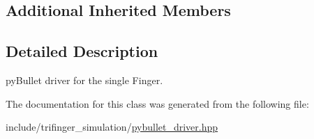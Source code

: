 \subsection*{Additional Inherited Members}


\subsection{Detailed Description}
py\+Bullet driver for the single Finger. 

The documentation for this class was generated from the following file\+:\begin{DoxyCompactItemize}
\item 
include/trifinger\+\_\+simulation/\hyperlink{pybullet__driver_8hpp}{pybullet\+\_\+driver.\+hpp}\end{DoxyCompactItemize}
